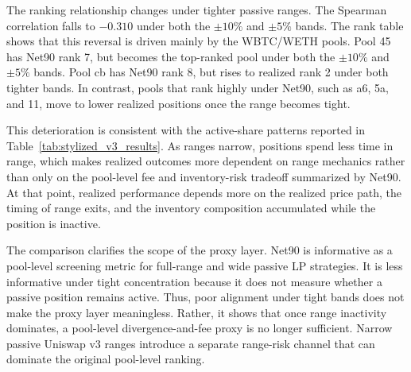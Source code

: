 \documentclass[anonymous]{lipics-v2021}
\begin{document}
{{The ranking relationship changes under tighter passive ranges. The Spearman correlation falls to $-0.310$ under both the $\pm10\%$ and $\pm5\%$ bands. The rank table shows that this reversal is driven mainly by the WBTC/WETH pools. Pool 45 has Net90 rank 7, but becomes the top-ranked pool under both the $\pm10\%$ and $\pm5\%$ bands. Pool cb has Net90 rank 8, but rises to realized rank 2 under both tighter bands. In contrast, pools that rank highly under Net90, such as a6, 5a, and 11, move to lower realized positions once the range becomes tight.}

{This deterioration is consistent with the active-share patterns reported in Table~\ref{tab:stylized_v3_results}. As ranges narrow, positions spend less time in range, which makes realized outcomes more dependent on range mechanics rather than only on the pool-level fee and inventory-risk tradeoff summarized by Net90. At that point, realized performance depends more on the realized price path, the timing of range exits, and the inventory composition accumulated while the position is inactive.}

{The comparison clarifies the scope of the proxy layer. 
Net90 is informative as a pool-level screening metric for full-range and wide passive LP strategies. 
It is less informative under tight concentration because it does not measure whether a passive position remains active. 
Thus, poor alignment under tight bands does not make the proxy layer meaningless. 
Rather, it shows that once range inactivity dominates, a pool-level divergence-and-fee proxy is no longer sufficient. 
Narrow passive Uniswap v3 ranges introduce a separate range-risk channel that can dominate the original pool-level ranking.}

\begin{figure}[t]
\centering
\footnotesize


\end{figure}}
\end{document}
